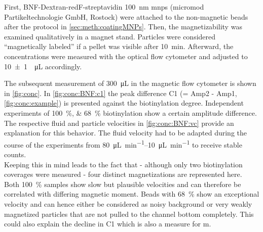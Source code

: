 First, BNF-Dextran-redF-streptavidin \SI{100}{\nano\meter} \glspl{mnp} (micromod Partikeltechnologie GmbH, Rostock) were attached to the non-magnetic beads after the protocol in \cref{sec:meth:coatingMNPs}. Then, the magnetizability was examined qualitatively in a magnet stand. Particles were considered ``magnetically labeled'' if a pellet was visible after \SI{10}{\minute}. Afterward, the concentrations were measured with the optical flow cytometer and adjusted to \SI{10 +- 1}{\per\micro\liter} accordingly.

The subsequent measurement of \SI{300}{\micro\liter} in the magnetic flow cytometer is shown in \cref{fig:conc}. In \cref{fig:conc:BNF:c1} the peak difference C1 (= Amp2 - Amp1, \cref{fig:conc:example}) is presented against the biotinylation degree. Independent experiments of \SIlist{100;68}{\percent} biotinylation show a certain amplitude difference. The respective fluid and particle velocities in \cref{fig:conc:BNF:vc} provide an explanation for this behavior. The fluid velocity had to be adapted during the course of the experiments from \SIrange{80}{10}{\micro\liter\per\minute} to receive stable counts.\\
Keeping this in mind leads to the fact that - although only two biotinylation coverages were measured - four distinct magnetizations are represented here. Both \SI{100}{\percent} samples show slow but plausible velocities and can therefore be correlated with differing magnetic moment. Beads with \SI{68}{\percent} show an exceptional velocity and can hence either be considered as noisy background or very weakly magnetized particles that are not pulled to the channel bottom completely. This could also explain the decline in C1 which is also a measure for \acrlong{m}.

